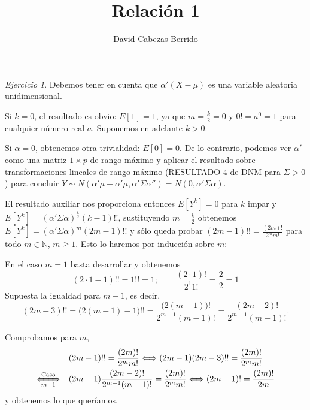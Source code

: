 \documentclass[12pt,spanish]{article}
\title{Relación 1}
\author{David Cabezas Berrido}
\date{}
\theoremstyle{definition}
\theoremstyle{remark}
\newtheorem{exercise}{Ejercicio}
\begin{document}
\maketitle

\setcounter{exercise}{2}
\begin{exercise} %

  Debemos tener en cuenta que $\alpha'(X-\mu)$ es una variable
  aleatoria unidimensional.
  
  Si $k=0$, el resultado es obvio: $E[1]=1$, ya que $m=\frac{k}{2}=0$
  y $0!=a^0=1$ para cualquier número real $a$. Suponemos en adelante
  $k>0$.
  
  Si $\alpha=0$, obtenemos otra trivialidad: $E[0]=0$. De lo
  contrario, podemos ver $\alpha'$ como una matriz $1\times p$ de
  rango máximo y aplicar el resultado sobre transformaciones lineales
  de rango máximo (RESULTADO 4 de DNM para $\Sigma>0$) para concluir
  $Y\sim
  N(\alpha'\mu-\alpha'\mu,\alpha'\Sigma\alpha'')=N(0,\alpha'\Sigma\alpha)$.
  
  El resultado auxiliar nos proporciona entonces $E[Y^k]=0$ para $k$
  impar y \\ $E[Y^k]=(\alpha'\Sigma\alpha)^\frac{k}{2} (k-1)!!$,
  sustituyendo $m=\frac{k}{2}$ obtenemos
  $E[Y^k]=(\alpha'\Sigma\alpha)^m (2m-1)!!$ y sólo queda probar
  $(2m-1)!!=\frac{(2m)!}{2^m m!}$ para todo $m\in\mathbb{N}$,
  $m\geq 1$. Esto lo haremos por inducción sobre $m$:
  
  En el caso $m=1$ basta desarrollar y obtenemos
  \[(2\cdot 1-1)!!=1!!=1;\qquad \frac{(2\cdot 1)!}{2^1
      1!}=\frac{2}{2}=1\] Supuesta la igualdad para $m-1$, es decir,
  \[(2m-3)!!=\big(2(m-1)-1\big)!!=\frac{\big(2(m-1)\big)!}{2^{m-1} (m-1)!}=\frac{(2m-2)!}{2^{m-1} (m-1)!}.\]

  Comprobamos para $m$,
  \begin{align*}
    &(2m-1)!!=\frac{(2m)!}{2^m m!}
      \Longleftrightarrow (2m-1)(2m-3)!!=\frac{(2m)!}{2^m m!} \\
    \xLeftrightarrow[m-1]{\text{Caso}}\quad &(2m-1)\frac{(2m-2)!}{2^{m-1}(m-1)!}=\frac{(2m)!}{2^m m!} \Longleftrightarrow (2m-1)!=\frac{(2m)!}{2m}
  \end{align*}
  y obtenemos lo que queríamos.
  
\end{exercise}
\end{document}
